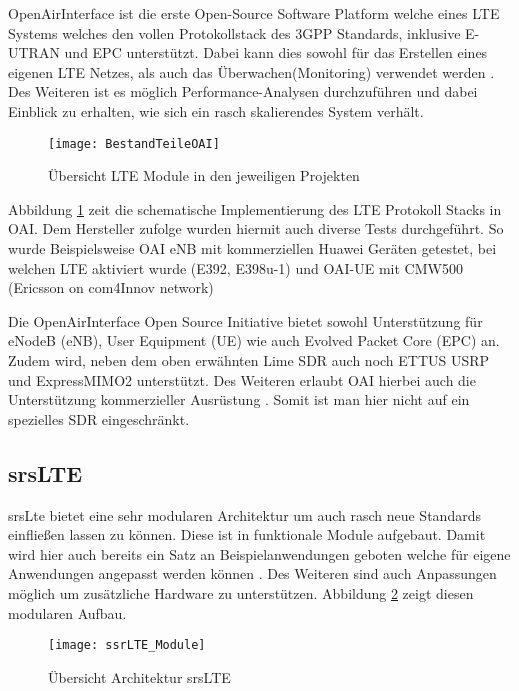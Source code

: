 OpenAirInterface ist die erste Open-Source Software Platform welche eines LTE Systems welches den vollen Protokollstack des 3GPP Standards, inklusive E-UTRAN und EPC unterstützt.
Dabei kann dies sowohl für das Erstellen eines eigenen LTE Netzes, als auch das Überwachen(Monitoring) verwendet werden \cite{nikaein2014openairinterface}.
Des Weiteren ist es möglich Performance-Analysen durchzuführen und dabei Einblick zu erhalten, wie sich ein rasch skalierendes System verhält. 

\begin{figure}
	\centering
	\texttt{[image: BestandTeileOAI]}
	\caption{Übersicht LTE Module in den jeweiligen Projekten \protect\cite{openAirInterfaceOverview19}}
	\label{fig:modulesOAI}
\end{figure}


Abbildung \ref{fig:modulesOAI} zeit die schematische Implementierung des LTE Protokoll Stacks in OAI.
Dem Hersteller zufolge wurden hiermit auch diverse Tests durchgeführt. So wurde Beispielsweise OAI eNB mit kommerziellen Huawei Geräten getestet, bei welchen LTE aktiviert wurde (E392, E398u-1) und OAI-UE mit CMW500 (Ericsson on com4Innov network)

Die OpenAirInterface Open Source Initiative bietet sowohl Unterstützung für eNodeB (eNB), User Equipment (UE) wie auch Evolved Packet Core (EPC) an. Zudem wird, neben dem oben erwähnten Lime SDR auch noch ETTUS  USRP und ExpressMIMO2 unterstützt. Des Weiteren erlaubt OAI hierbei auch die Unterstützung kommerzieller Ausrüstung \cite{kaltenberger2019openairinterface}. Somit ist man hier nicht auf ein spezielles SDR eingeschränkt.

\subsection{srsLTE}
srsLte bietet eine sehr modularen Architektur um auch rasch neue Standards einfließen lassen zu können. Diese ist in funktionale Module aufgebaut. Damit wird hier auch bereits ein Satz an Beispielanwendungen geboten welche für eigene Anwendungen angepasst werden können \cite{puschmann2017implementing}. 
Des Weiteren sind auch Anpassungen möglich um zusätzliche Hardware zu unterstützen. 
Abbildung \ref{fig:modulessrsLTE} zeigt diesen modularen Aufbau.

\begin{figure}
	\centering
	\texttt{[image: ssrLTE\_Module]}
	\caption{Übersicht Architektur srsLTE \protect\cite{puschmann2017implementing}}
	\label{fig:modulessrsLTE}
\end{figure}

